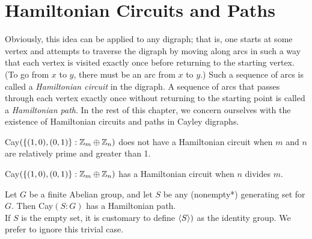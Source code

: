 \section{Hamiltonian Circuits and Paths}

\begin{remark}
	Obviously, this idea can be applied to any digraph; that is, one starts at some vertex and attempts to traverse the digraph by moving along arcs in such a way that each vertex is visited exactly once before returning to the starting vertex. (To go from $x$ to $y$, there must be an arc from $x$ to $y$.) Such a sequence of arcs is called a \textit{Hamiltonian circuit} in the digraph. A sequence of arcs that passes through each vertex exactly once without returning to the starting point is called a \textit{Hamiltonian path}. In the rest of this chapter, we concern ourselves with the existence of Hamiltonian circuits and paths in Cayley digraphs.
\end{remark}

\begin{theorem}
	Cay$(\{(1,0),(0,1)\}:\mathbb{Z}_m \oplus \mathbb{Z}_n)$ does not have a Hamiltonian circuit when $m$ and $n$ are relatively prime and greater than 1.
\end{theorem}

\begin{theorem}
	Cay$(\{(1,0),(0,1)\}:\mathbb{Z}_m \oplus \mathbb{Z}_n)$ has a Hamiltonian circuit when $n$ divides $m$.
\end{theorem}

\begin{theorem}
	Let $G$ be a finite Abelian group, and let $S$ be any (nonempty*) generating set for $G$. Then Cay$(S:G)$ has a Hamiltonian path.\\


	\noindent *If $S$ is the empty set, it is customary to define $\langle S \rangle)$ as the identity group. We prefer to ignore this trivial case.
\end{theorem}

